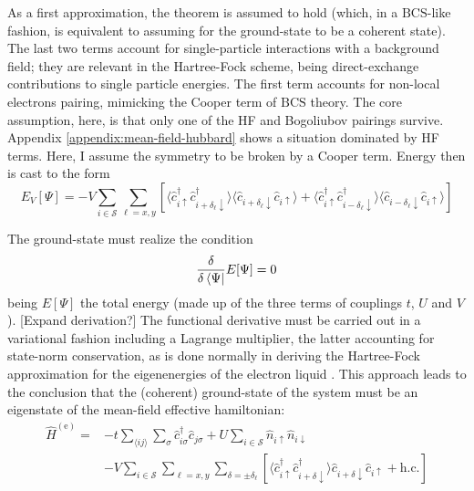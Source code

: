 As a first approximation, the theorem is assumed to hold (which, in a $\mathrm{BCS}$-like fashion, is equivalent to assuming for the ground-state to be a coherent state). The last two terms account for single-particle interactions with a background field; they are relevant in the Hartree-Fock scheme, being direct-exchange contributions to single particle energies. The first term accounts for non-local electrons pairing, mimicking the Cooper term of $\mathrm{BCS}$ theory. {\color{tabred}The core assumption, here, is that only one of the HF and Bogoliubov pairings survive. Appendix \ref{appendix:mean-field-hubbard} shows a situation dominated by HF terms. Here, I assume the symmetry to be broken by a Cooper term.} Energy then is cast to the form
\[
	E_V[\Psi] = -V \sum_{i \in \mathcal{S}} \sum_{\ell = x,y}
	\left[
		\langle
			\hat c_{i\uparrow}^\dagger \hat c_{i + \delta_\ell \downarrow}^\dagger
		\rangle \langle	
			\hat c_{i + \delta_\ell \downarrow} \hat c_{i\uparrow} 
		\rangle + \langle 
			\hat c_{i\uparrow}^\dagger \hat c_{i - \delta_\ell \downarrow}^\dagger
		\rangle \langle	
			\hat c_{i - \delta_\ell \downarrow} \hat c_{i\uparrow} 
		\rangle
	\right]
\]

The ground-state must realize the condition
\[
	\fdv{}{\bra{\Psi}} E[\Psi] = 0
\]
being $E[\Psi]$ the total energy (made up of the three terms of couplings $t$, $U$ and $V$). {\color{tabred}[Expand derivation?]} The functional derivative must be carried out in a variational fashion including a Lagrange multiplier, the latter accounting for state-norm conservation, as is done normally in deriving the Hartree-Fock approximation for the eigenenergies of the electron liquid \cite{grosso2014solid, giuliani2005quantum}. This approach leads to the conclusion that the (coherent) ground-state of the system must be an eigenstate of the mean-field effective hamiltonian:
\begin{equation}\label{eq:extended-hubbard-model-effective-intermediate}
	\begin{aligned}
		\hat H^{(\mathrm{e})} =
		&-t \sum_{\langle ij \rangle} \sum_\sigma \hat c_{i\sigma}^\dagger \hat c_{j\sigma}
		+ U \sum_{i \in \mathcal{S}} \hat n_{i\uparrow} \hat n_{i\downarrow} \\
		&- V \sum_{i \in \mathcal{S}} \sum_{\ell = x,y} \sum_{\delta = \pm \delta_\ell} \left[
			\langle 
				\hat c_{i\uparrow}^\dagger \hat c_{i + \delta \downarrow}^\dagger
			\rangle
			\hat c_{i + \delta \downarrow} \hat c_{i\uparrow} 
			+ \mathrm{h}.\mathrm{c}.
		\right]
	\end{aligned}
\end{equation}


